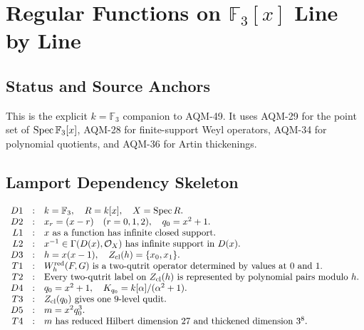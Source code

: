 
\section{Regular Functions on \texorpdfstring{\(\mathbb F_3[x]\)}{F3[x]} Line by Line}
\label{sec:f3-regular-functions-line-by-line}

\subsection{Status and Source Anchors}
This is the explicit \(k=\mathbb F_3\) companion to AQM-49.  It uses AQM-29 for
the point set of \(\operatorname{Spec}\mathbb F_3[x]\), AQM-28 for finite-support Weyl
operators, AQM-34 for polynomial quotients, and AQM-36 for Artin thickenings.

\subsection{Lamport Dependency Skeleton}
\[
\begin{array}{rcl}
D1&:&k=\mathbb F_3,\quad R=k[x],\quad X=\operatorname{Spec} R.\\
D2&:&x_r=(x-r)\quad(r=0,1,2),\quad
      q_0=x^2+1.\\
L1&:&x\text{ as a function has infinite closed support}.\\
L2&:&x^{-1}\in\Gamma(D(x),\mathcal O_X)\text{ has infinite support in }D(x).\\
D3&:&h=x(x-1),\quad Z_{\rm cl}(h)=\{x_0,x_1\}.\\
T1&:&W_h^{\rm red}(F,G)\text{ is a two-qutrit operator determined by
      values at }0\text{ and }1.\\
T2&:&\text{Every two-qutrit label on }Z_{\rm cl}(h)\text{ is represented by
      polynomial pairs modulo }h.\\
D4&:&q_0=x^2+1,\quad K_{q_0}=k[\alpha]/(\alpha^2+1).\\
T3&:&Z_{\rm cl}(q_0)\text{ gives one }9\text{-level qudit}.\\
D5&:&m=x^2q_0^3.\\
T4&:&m\text{ has reduced Hilbert dimension }27\text{ and thickened dimension }
      3^8.\\
\end{array}
\]


